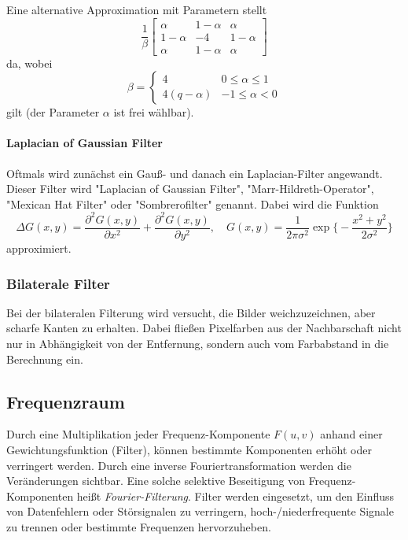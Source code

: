 					Eine alternative Approximation mit Parametern stellt
					\begin{equation*}
						\frac{1}{\beta}
						\begin{bmatrix}
							\alpha     & 1 - \alpha & \alpha     \\
							1 - \alpha & -4         & 1 - \alpha \\
							\alpha     & 1 - \alpha & \alpha
						\end{bmatrix}
					\end{equation*}
					da, wobei
					\begin{equation*}
						\beta =
							\begin{cases}
								4             & 0 \leq \alpha \leq 1 \\
								4(q - \alpha) & -1 \leq \alpha < 0
							\end{cases}
					\end{equation*}
					gilt (der Parameter \( \alpha \) ist frei wählbar).
				
				\paragraph{Laplacian of Gaussian Filter}
					Oftmals wird zunächst ein Gauß- und danach ein Laplacian-Filter angewandt. Dieser Filter wird "Laplacian of Gaussian Filter", "Marr-Hildreth-Operator", "Mexican Hat Filter" oder "Sombrerofilter" genannt. Dabei wird die Funktion
					\begin{equation*}
						\Delta G(x, y) = \frac{\partial^2 G(x, y)}{\partial x^2} + \frac{\partial^2 G(x, y)}{\partial y^2},\quad G(x, y) = \frac{1}{2\pi\sigma^2} \exp \Bigg\{ -\frac{x^2 + y^2}{2\sigma^2} \Bigg\}
					\end{equation*}
					approximiert.
			
			\subsubsection{Bilaterale Filter}
				Bei der bilateralen Filterung wird versucht, die Bilder weichzuzeichnen, aber scharfe Kanten zu erhalten. Dabei fließen Pixelfarben aus der Nachbarschaft nicht nur in Abhängigkeit von der Entfernung, sondern auch vom Farbabstand in die Berechnung ein.

		\subsection{Frequenzraum}
			Durch eine Multiplikation jeder Frequenz-Komponente \( F(u, v) \) anhand einer Gewichtungsfunktion (Filter), können bestimmte Komponenten erhöht oder verringert werden. Durch eine inverse Fouriertransformation werden die Veränderungen sichtbar. Eine solche selektive Beseitigung von Frequenz-Komponenten heißt \emph{Fourier-Filterung}. Filter werden \bspw eingesetzt, um den Einfluss von Datenfehlern oder Störsignalen zu verringern, hoch-/niederfrequente Signale zu trennen oder bestimmte Frequenzen hervorzuheben.
			
